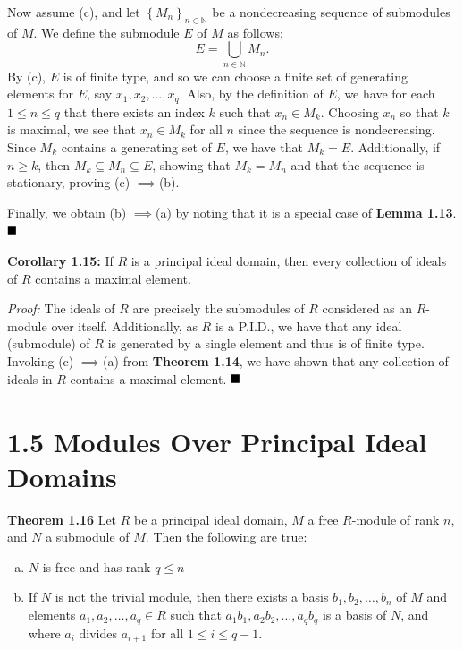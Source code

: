 \documentclass[12pt]{article}
\newcommand{\N}{\ensuremath{\mathbb{N}}}
\newcommand{\braceb}[1]{\left\{#1\right\}}
\newcommand{\proof}{\textit{Proof: }}
\newcommand{\done}{\ensuremath{\strut\hfill\blacksquare}}
\newcommand{\impl}{\ensuremath{\implies}}
\begin{document}
Now assume (c), and let \( \braceb{M_n}_{n \in \N} \) be a nondecreasing
sequence of submodules of \( M \).
We define the submodule \( E \) of \( M \) as follows:
\[
	E = \bigcup_{n \in \N} M_n.
\]
By (c), \( E \) is of finite type, and so we can choose a finite set of
generating elements for \( E \), say \( x_1, x_2, \dots, x_q \).
Also, by the definition of \( E \), we have for each \( 1 \leq n \leq q \)
that there exists an index \( k \) such that \( x_n \in M_k \).
Choosing \( x_n \) so that \( k \) is maximal, we see that \( x_n \in M_k \)
for all \( n \) since the sequence is nondecreasing.
Since \( M_k \) contains a generating set of \( E \), we have that
\( M_k = E \).
Additionally, if \( n \geq k \), then \( M_k \subseteq M_n \subseteq E \),
showing that \( M_k = M_n \) and that the sequence is stationary, proving
(c) \impl (b).

Finally, we obtain (b) \impl (a) by noting that it is a special case of
\textbf{Lemma 1.13}.
\done

\textbf{Corollary 1.15:}
If \( R \) is a principal ideal domain, then every collection of ideals
of \( R \) contains a maximal element.

\proof
The ideals of \( R \) are precisely the submodules of \( R \) considered as an
\( R \)-module over itself.
Additionally, as \( R \) is a P.I.D., we have that any ideal (submodule) of
\( R \) is generated by a single element and thus is of finite type.
Invoking (c) \impl (a) from \textbf{Theorem 1.14}, we have shown that any
collection of ideals in \( R \) contains a maximal element.
\done

\section*{1.5 Modules Over Principal Ideal Domains}

\textbf{Theorem 1.16}
Let \( R \) be a principal ideal domain, \( M \) a free \( R \)-module of rank
\( n \), and \( N \) a submodule of \( M \).
Then the following are true:
\begin{enumerate}[(a)]
	\item \( N \) is free and has rank \( q \leq n \)

	\item If \( N \) is not the trivial module, then there exists a basis
	      \( b_1, b_2, \dots, b_n \) of \( M \) and elements
	      \( a_1, a_2, \dots, a_q \in R \) such that
	      \( a_1b_1, a_2b_2, \dots, a_qb_q \) is a basis of \( N \), and where
	      \( a_i \) divides \( a_{i + 1} \) for all \( 1 \leq i \leq q - 1 \).
\end{enumerate}
\end{document}
